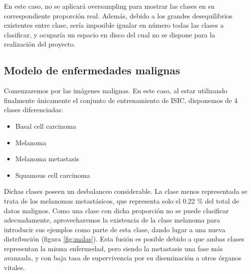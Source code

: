 En este caso, no se aplicará oversampling para mostrar las clases en su correspondiente proporción real.  Además, debido a los grandes desequilibrios existentes entre clase, sería imposible igualar en número todas las clases a clasificar, y ocuparía un espacio en disco del cual no se dispone para la realización del proyecto.

\subsection{Modelo de enfermedades malignas}

Comenzaremos por las imágenes malignas. En este caso, al estar utilizando finalmente únicamente el conjunto de entrenamiento de ISIC, disponemos de 4 clases diferenciadas:

\begin{itemize}
	\item Basal cell carcinoma
	\item Melanoma
	\item Melanoma metastasis
	\item Squamous cell carcinoma
	
\end{itemize}

Dichas clases poseen un desbalanceo considerable. La clase menos representada se trata de los melanomas metastásicos, que representa solo el 0.22 \% del total de datos malignos. Como una clase con dicha proporción no se puede clasificar adecuadamente, aprovecharemos la existencia de la clase melanoma para introducir sus ejemplos como parte de esta clase, dando lugar a una nueva distribución (figura \ref{fig:malas}). Esta fusión es posible debido a que ambas clases representan la misma enfermedad, pero siendo la metastasis una fase más avanzada, y con baja tasa de supervivencia por su diseminación a otros órganos vitales.

